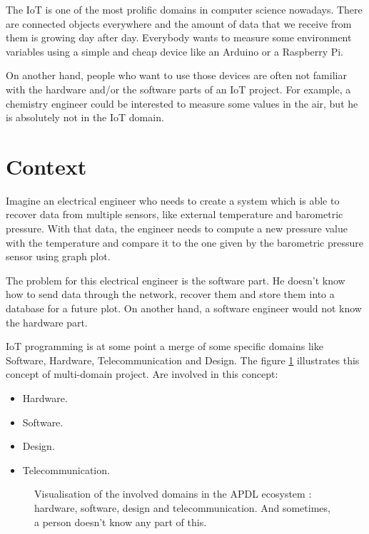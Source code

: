 
The \gls{IoT} is one of the most prolific domains in computer science
nowadays. There are connected objects everywhere and the amount of data that we
receive from them is growing day after day. Everybody wants to measure some
environment variables using a simple and cheap device like an Arduino or a
Raspberry Pi.

On another hand, people who want to use those devices are often not familiar
with the hardware and/or the software parts of an IoT project. For example, a
chemistry engineer could be interested to measure some values in the air, but he
is absolutely not in the IoT domain.

\section{Context}
\label{sec:intro-context}

Imagine an electrical engineer who needs to create a system which is able to
recover data from multiple sensors, like external temperature and barometric
pressure. With that data, the engineer needs to compute a new pressure value
with the temperature and compare it to the one given by the barometric pressure
sensor using graph plot.

The problem for this electrical engineer is the software part. He doesn't know how
to send data through the network, recover them and store them into a database
for a future plot. On another hand, a software engineer would not know the hardware part.

IoT programming is at some point a merge of some specific domains like Software,
Hardware, Telecommunication and Design. The figure \ref{fig:basic_archi} illustrates
this concept of multi-domain project. Are involved in this concept:

\begin{itemize}
\item Hardware.
\item Software.
\item Design.
\item Telecommunication.
\end{itemize}

\begin{figure}[H]
  \centering
  \caption[Basic APDL architecture example]{ Visualisation of the involved domains
in the APDL ecosystem : hardware, software, design and
telecommunication. And sometimes, a person doesn't know any part of this.}
  \label{fig:basic_archi}
\end{figure}

